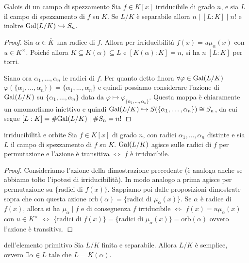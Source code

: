 \begin{theorem}{Galois di un campo di spezzamento}
    Sia $f \in K[x]$ irriducibile di grado $n$, e sia $L$ il campo di spezzamento di $f$ su $K$. Se $L/K$ è separabile allora $n \mid [L:K] \mid n!$ e inoltre $\text{Gal}(L/K) \hookrightarrow S_n$.
\end{theorem}
\begin{proof}
    Sia $\alpha \in \overline{K}$ una radice di $f$. Allora per irriducibilità $f(x) = u \mu_{\alpha}(x)$ con $u \in K^\times$. Poiché allora $K \subseteq K(\alpha) \subseteq L$ e $[K(\alpha) : K] = n$, si ha $n | [L:K]$ per torri.

    Siano ora $\alpha_1,\dots,\alpha_n$ le radici di $f$. Per quanto detto finora $\forall \varphi \in \text{Gal}(L/K)$  $\varphi(\{\alpha_1,\dots,\alpha_n\}) = \{\alpha_1,\dots,\alpha_n\}$ e quindi possiamo considerare l'azione di $\text{Gal}(L/K)$ su $\{\alpha_1,\dots,\alpha_n\}$ data da $\varphi \mapsto \varphi_{\{\alpha_1,\dots,\alpha_n\}}$. Questa mappa è chiaramente un omomorfismo iniettivo e quindi $\text{Gal}(L/K) \hookrightarrow S(\{\alpha_1,\dots,\alpha_n\}) \cong S_n$, da cui segue $[L:K] = \#\text{Gal}(L/K) \mid \#S_n = n!$
\end{proof}
\begin{proposition}{irriducibilità e orbite}
    Sia $f \in K[x]$ di grado $n$, con radici $\alpha_1,\dots,\alpha_n$ distinte e sia $L$ il campo di spezzamento di $f$ su $K$. $\text{Gal}(L/K)$ agisce sulle radici di $f$ per permutazione e l'azione è transitiva $\iff$ $f$ è irriducibile.
\end{proposition}
\begin{proof}
    Consideriamo l'azione della dimostrazione precedente (è analoga anche se abbiamo tolto l'ipotesi di irriducibilità). In modo analogo a prima agisce per permutazione su $\{ \text{radici di } f(x)\}$. Sappiamo poi dalle proposizioni dimostrate sopra che con questa azione $\text{orb}(\alpha) = \{ \text{radici di } \mu_{\alpha}(x)\}$. Se $\alpha$ è radice di $f(x)$, allora si ha $\mu_{\alpha} \mid f$ e di conseguenza $f$ irriducibile $\iff$ $f(x) = u\mu_{\alpha}(x)$ con $u \in K^\times$ $\iff$ $\{ \text{radici di } f(x)\} =  \{ \text{radici di } \mu_{\alpha}(x)\} =\text{orb}(\alpha)$ ovvero l'azione è transitiva.
\end{proof}
\begin{theorem}{dell'elemento primitivo}
        Sia $L/K$ finita e separabile. Allora $L/K$ è semplice, ovvero $\exists \alpha \in L$ tale che $L = K(\alpha)$. 
\end{theorem}
